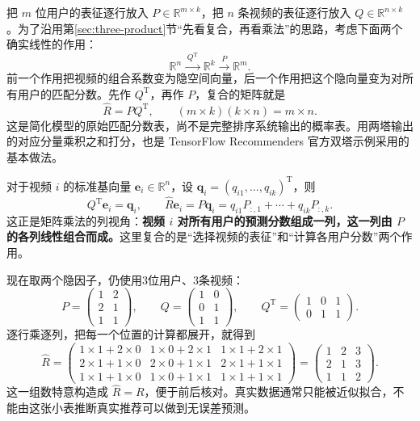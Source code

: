 \documentclass[a4paper,12pt,twoside,openany,fontset=none]{ctexbook}
\numberwithin{equation}{chapter}
\begin{document}
把 $m$ 位用户的表征逐行放入 $P\in\mathbb R^{m\times k}$，把 $n$ 条视频的表征逐行放入 $Q\in\mathbb R^{n\times k}$。为了沿用第\ref{sec:three-product}节“先看复合，再看乘法”的思路，考虑下面两个确实线性的作用：
\[
 \mathbb R^n\xrightarrow{\;Q^{\mathrm T}\;}\mathbb R^k
 \xrightarrow{\;P\;}\mathbb R^m.
\]
前一个作用把视频的组合系数变为隐空间向量，后一个作用把这个隐向量变为对所有用户的匹配分数。先作 $Q^{\mathrm T}$，再作 $P$，复合的矩阵就是
\[
 \boxed{\widehat R=PQ^{\mathrm T}},\qquad
 (m\times k)(k\times n)=m\times n.
\]
这是简化模型的原始匹配分数表，尚不是完整排序系统输出的概率表。用两塔输出的对应分量乘积之和打分，也是 TensorFlow Recommenders 官方双塔示例采用的基本\mbox{做法。\cite{tfrs-two-tower}}

对于视频 $i$ 的标准基向量 $\boldsymbol e_i\in\mathbb R^n$，设 $\boldsymbol q_i=(q_{i1},\ldots,q_{ik})^{\mathrm T}$，则
\[
 Q^{\mathrm T}\boldsymbol e_i=\boldsymbol q_i,\qquad
 \widehat R\boldsymbol e_i=P\boldsymbol q_i
 =q_{i1}P_{:,1}+\cdots+q_{ik}P_{:,k}.
\]
这正是矩阵乘法的列视角：\textbf{视频 $i$ 对所有用户的预测分数组成一列，这一列由 $P$ 的各列线性组合而成。}这里复合的是“选择视频的表征”和“计算各用户分数”两个作用。

现在取两个隐因子，仍使用3位用户、3条视频：
\[
 P=\begin{pmatrix}1&2\\2&1\\1&1\end{pmatrix},\qquad
 Q=\begin{pmatrix}1&0\\0&1\\1&1\end{pmatrix},\qquad
 Q^{\mathrm T}=\begin{pmatrix}1&0&1\\0&1&1\end{pmatrix}.
\]
逐行乘逐列，把每一个位置的计算都展开，就得到
\[
 \widehat R=
 \begin{pmatrix}
 1\times1+2\times0&1\times0+2\times1&1\times1+2\times1\\
 2\times1+1\times0&2\times0+1\times1&2\times1+1\times1\\
 1\times1+1\times0&1\times0+1\times1&1\times1+1\times1
 \end{pmatrix}
 =\begin{pmatrix}1&2&3\\2&1&3\\1&1&2\end{pmatrix}.
\]
这一组数特意构造成 $\widehat R=R$，便于前后核对。真实数据通常只能被近似拟合，不能由这张小表推断真实推荐可以做到无误差预测。
\end{document}
